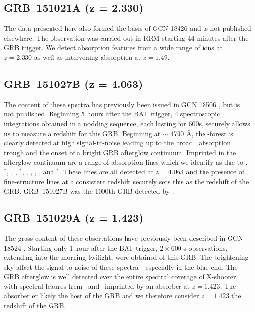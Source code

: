 \documentclass{aa}    %
\begin{document}
\subsection{GRB~151021A (z = 2.330)}\label{151021}

The data presented here also formed the basis of GCN 18426 \citep{GCN18982} and
is not published elsewhere. The observation was carried out in RRM starting 44
minutes after the GRB trigger. We detect absorption features from a wide range
of ions at $z=2.330$ as well as intervening absorption at $z=1.49$.

\subsection{GRB~151027B (z = 4.063)}\label{151027}

The content of these spectra has previously been issued in GCN 18506
\citep{GCN18506}, but is not published. Beginning 5 hours after the BAT trigger,
4 spectroscopic integrations obtained in a nodding sequence, each lasting for
600s, securely allows us to measure a redshift for this GRB. Beginning at $\sim$
4700 \AA, the \lya-forest is clearly detected at high signal-to-noise leading up
to the broad \lya~absorption trough and the onset of a bright GRB afterglow
continuum. Imprinted in the afterglow continuum are a range of absorption lines
which we identify as due to \SIii, \SIii$^*$, \oi, \cii, \cii$^*$, \civ, \alii, 
\alii, \feii, and \feii$^*$. These lines are all detected at $z = 4.063$ and the
presence of fine-structure lines at a consistent redshift securely sets this as
the redshift of the GRB. GRB~151027B was the 1000th GRB detected by \swift.

\subsection{GRB~151029A (z = 1.423)}\label{151029}

The gross content of these observations have previously been described in GCN
18524 \citep{GCN18524}. Starting only 1 hour after the BAT trigger, $2 \times
600$ s observations, extending into the morning twilight, were obtained of this
GRB. The brightening sky affect the signal-to-noise of these spectra -
especially in the blue end. The GRB afterglow is well detected over the entire
spectral coverage of X-shooter, with spectral feaures from \feii~and
\mgii~imprinted by an absorber at $z = 1.423$. The absorber er likely the host
of the GRB and we therefore consider $z = 1.423$ the redshift of the GRB.
\end{document}
